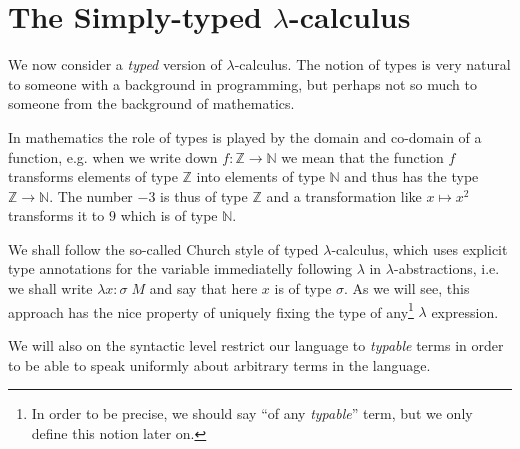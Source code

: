 \section{The Simply-typed $\lambda$-calculus}

We now consider a \emph{typed} version of $\lambda$-calculus. The notion of
types is very natural to someone with a background in programming, but perhaps
not so much to someone from the background of mathematics.

In mathematics the role of types is played by the domain and co-domain of a
function, e.g. when we write down $f: \mathbb{Z} \rightarrow \mathbb{N}$ we
mean that the function $f$ transforms elements of type $\mathbb{Z}$ into
elements of type $\mathbb{N}$ and thus has the type $\mathbb{Z} \rightarrow
\mathbb{N}$. The number $-3$ is thus of type $\mathbb{Z}$ and a transformation like
$x \mapsto x^2$ transforms it to $9$ which is of type $\mathbb{N}$.

We shall follow the so-called Church style of typed $\lambda$-calculus, which
uses explicit type annotations for the variable immediatelly following
$\lambda$ in $\lambda$-abstractions, i.e. we shall write $\lambda
x\!:\!\sigma\; M$ and say that here $x$ is of type $\sigma$. As we will see,
this approach has the nice property of uniquely fixing the type of
any\footnote{
    In order to be precise, we should say ``of any \emph{typable}''
    term, but we only define this notion later on.}
$\lambda$ expression.

We will also on the syntactic level restrict our language to \emph{typable}
terms in order to be able to speak uniformly about arbitrary terms in the
language.

